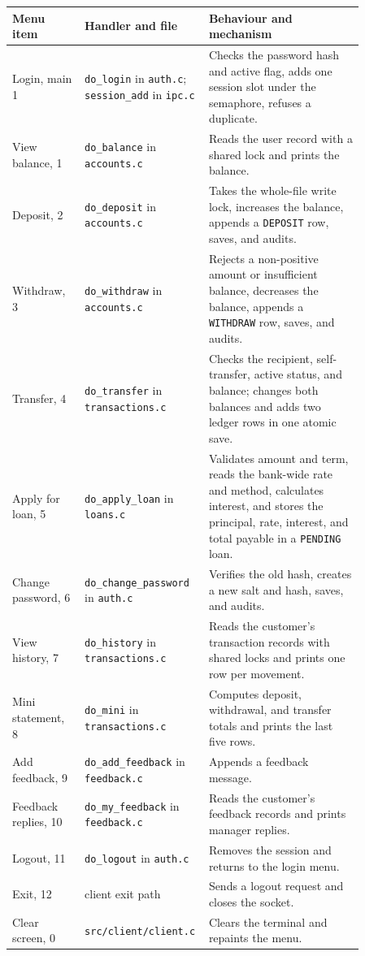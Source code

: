 \documentclass[11pt,a4paper]{article}
\begin{document}
\begin{longtable}{L{0.20\linewidth}L{0.23\linewidth}L{0.43\linewidth}}
\hline
Menu item & Handler and file & Behaviour and mechanism \\
\hline
\endhead
Login, main 1 & \texttt{do\_login} in \texttt{auth.c}; \texttt{session\_add} in \texttt{ipc.c} & Checks the password hash and active flag, adds one session slot under the semaphore, refuses a duplicate. \\
View balance, 1 & \texttt{do\_balance} in \texttt{accounts.c} & Reads the user record with a shared lock and prints the balance. \\
Deposit, 2 & \texttt{do\_deposit} in \texttt{accounts.c} & Takes the whole-file write lock, increases the balance, appends a \texttt{DEPOSIT} row, saves, and audits. \\
Withdraw, 3 & \texttt{do\_withdraw} in \texttt{accounts.c} & Rejects a non-positive amount or insufficient balance, decreases the balance, appends a \texttt{WITHDRAW} row, saves, and audits. \\
Transfer, 4 & \texttt{do\_transfer} in \texttt{transactions.c} & Checks the recipient, self-transfer, active status, and balance; changes both balances and adds two ledger rows in one atomic save. \\
Apply for loan, 5 & \texttt{do\_apply\_loan} in \texttt{loans.c} & Validates amount and term, reads the bank-wide rate and method, calculates interest, and stores the principal, rate, interest, and total payable in a \texttt{PENDING} loan. \\
Change password, 6 & \texttt{do\_change\_password} in \texttt{auth.c} & Verifies the old hash, creates a new salt and hash, saves, and audits. \\
View history, 7 & \texttt{do\_history} in \texttt{transactions.c} & Reads the customer's transaction records with shared locks and prints one row per movement. \\
Mini statement, 8 & \texttt{do\_mini} in \texttt{transactions.c} & Computes deposit, withdrawal, and transfer totals and prints the last five rows. \\
Add feedback, 9 & \texttt{do\_add\_feedback} in \texttt{feedback.c} & Appends a feedback message. \\
Feedback replies, 10 & \texttt{do\_my\_feedback} in \texttt{feedback.c} & Reads the customer's feedback records and prints manager replies. \\
Logout, 11 & \texttt{do\_logout} in \texttt{auth.c} & Removes the session and returns to the login menu. \\
Exit, 12 & client exit path & Sends a logout request and closes the socket. \\
Clear screen, 0 & \texttt{src/client/client.c} & Clears the terminal and repaints the menu. \\
\hline
\end{longtable}
\end{document}
